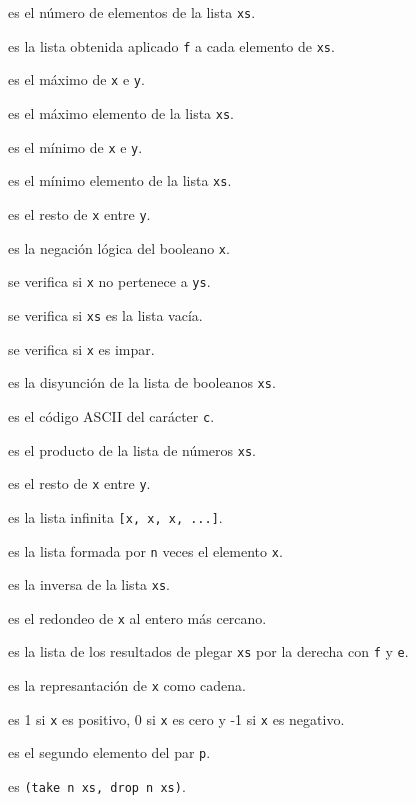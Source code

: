 \begin{enumerate*}
\item {} es el número de elementos de la lista \verb|xs|.
\item {} es la lista obtenida aplicado \verb|f| a cada elemento
  de \verb|xs|.
\item {} es el máximo de \verb|x| e \verb|y|.
\item {} es el máximo elemento de la lista \verb|xs|.
\item {} es el mínimo de \verb|x| e \verb|y|.
\item {} es el mínimo elemento de la lista \verb|xs|.
\item {} es el resto de \verb|x| entre \verb|y|.
\item {} es la negación lógica del booleano \verb|x|.
\item {} se verifica si \verb|x| no pertenece a \verb|ys|.
\item {} se verifica si \verb|xs| es la lista vacía.
\item {} se verifica si \verb|x| es impar.
\item {} es la disyunción de la lista de booleanos \verb|xs|.
\item {} es el código ASCII del carácter \verb|c|.
\item {} es el producto de la lista de números \verb|xs|.
\item {} es el resto de \verb|x| entre \verb|y|.
\item {} es la lista infinita \verb|[x, x, x, ...]|.
\item {} es la lista formada por \verb|n| veces el elemento
  \verb|x|.
\item {} es la inversa de la lista \verb|xs|.
\item {} es el redondeo de \verb|x| al entero más cercano.
\item {} es la lista de los resultados de plegar \verb|xs|
  por la derecha con \verb|f| y \verb|e|.
\item {} es la represantación de \verb|x| como cadena.
\item {} es 1 si \verb|x| es positivo, 0 si \verb|x| es cero y -1
  si \verb|x| es negativo.
\item {} es el segundo elemento del par \verb|p|.
\item {} es \verb|(take n xs, drop n xs)|.

\end{enumerate*}
